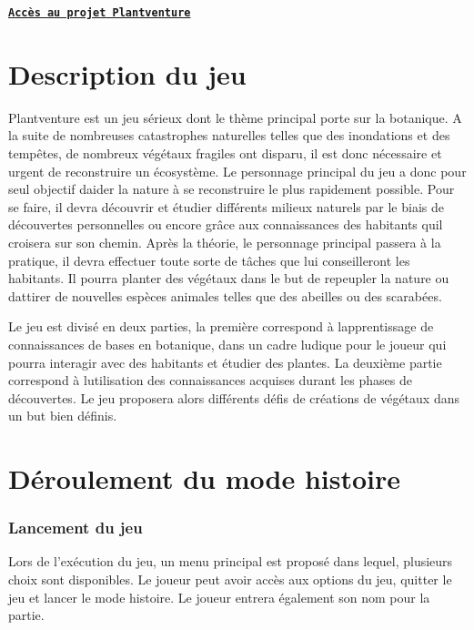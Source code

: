 {\bfseries \href{https://git.unistra.fr/T432_DIP18_T3_C/Juthoke}{\tt Accès au projet Plantventure}}

\section*{Description du jeu}

Plantventure est un jeu sérieux dont le thème principal porte sur la botanique. A la suite de nombreuses catastrophes naturelles telles que des inondations et des tempêtes, de nombreux végétaux fragiles ont disparu, il est donc nécessaire et urgent de reconstruire un écosystème. Le personnage principal du jeu a donc pour seul objectif d\textquotesingle{}aider la nature à se reconstruire le plus rapidement possible. Pour se faire, il devra découvrir et étudier différents milieux naturels par le biais de découvertes personnelles ou encore grâce aux connaissances des habitants qu\textquotesingle{}il croisera sur son chemin. Après la théorie, le personnage principal passera à la pratique, il devra effectuer toute sorte de tâches que lui conseilleront les habitants. Il pourra planter des végétaux dans le but de repeupler la nature ou d\textquotesingle{}attirer de nouvelles espèces animales telles que des abeilles ou des scarabées.

Le jeu est divisé en deux parties, la première correspond à l\textquotesingle{}apprentissage de connaissances de bases en botanique, dans un cadre ludique pour le joueur qui pourra interagir avec des habitants et étudier des plantes. La deuxième partie correspond à l\textquotesingle{}utilisation des connaissances acquises durant les phases de découvertes. Le jeu proposera alors différents défis de créations de végétaux dans un but bien définis.

\section*{Déroulement du mode histoire}

\subsubsection*{Lancement du jeu}

Lors de l’exécution du jeu, un menu principal est proposé dans lequel, plusieurs choix sont disponibles. Le joueur peut avoir accès aux options du jeu, quitter le jeu et lancer le mode histoire. Le joueur entrera également son nom pour la partie.

